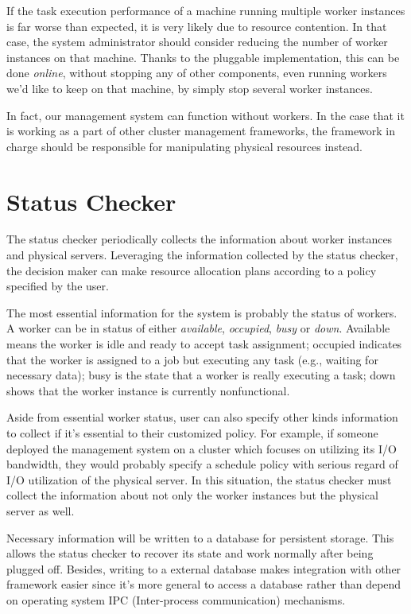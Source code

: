 If the task execution performance of a machine running multiple worker
instances is far worse than expected, it is very likely due to resource
contention.  In that case, the system administrator should consider
reducing the number of worker instances on that machine.  Thanks to the
pluggable implementation, this can be done \emph{online}, without
stopping any of other components, even running workers we'd like to keep
on that machine, by simply stop several worker instances.

In fact, our management system can function without workers.  In the
case that it is working as a part of other cluster management
frameworks, the framework in charge should be responsible for
manipulating physical resources instead.

\section{Status Checker}

The status checker periodically collects the information about worker
instances and physical servers.  Leveraging the information collected
by the status checker, the decision maker can make resource allocation
plans according to a policy specified by the user.

The most essential information for the system is probably the status of
workers.  A worker can be in status of either \emph{available},
\emph{occupied}, \emph{busy} or \emph{down}.  Available means the worker
is idle and ready to accept task assignment; occupied indicates that the
worker is assigned to a job but executing any task (e.g., waiting for
necessary data); busy is the state that a worker is really executing a
task; down shows that the worker instance is currently nonfunctional. 

Aside from essential worker status, user can also specify other kinds
information to collect if it's essential to  their customized policy.
For example, if someone deployed the management system on a cluster
which focuses on utilizing its I/O bandwidth, they would probably
specify a schedule policy with serious regard of I/O utilization of the
physical server.  In this situation, the status checker must collect the
information about not only the worker instances but the physical server
as well.

Necessary information will be written to a database for persistent
storage.  This allows the status checker to recover its state and work
normally after being plugged off.  Besides, writing to a external
database makes integration with other framework easier since it's more
general to access a database rather than depend on operating system IPC
(Inter-process communication) mechanisms.

